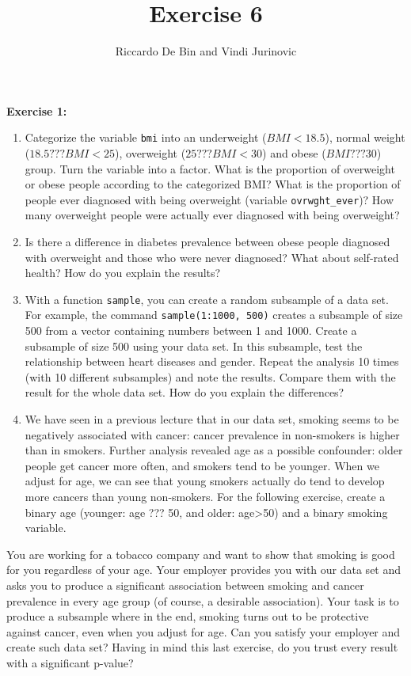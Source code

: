 \documentclass[]{article}
\title{Exercise 6}
\author{Riccardo De Bin and Vindi Jurinovic}
\date{}
\begin{document}
\maketitle


\textbf{Exercise 1:}

\begin{enumerate}
\def\labelenumi{\arabic{enumi}.}
\item
  Categorize the variable \texttt{bmi} into an underweight
  ($BMI < 18.5$), normal weight ($18.5 ??? BMI < 25$), overweight
  ($25 ??? BMI < 30$) and obese ($BMI ??? 30$) group. Turn the variable
  into a factor. What is the proportion of overweight or obese people
  according to the categorized BMI? What is the proportion of people
  ever diagnosed with being overweight (variable
  \texttt{ovrwght\_ever})? How many overweight people were actually ever
  diagnosed with being overweight?
\item
  Is there a difference in diabetes prevalence between obese people
  diagnosed with overweight and those who were never diagnosed? What
  about self-rated health? How do you explain the results?
\item
  With a function \texttt{sample}, you can create a random subsample of
  a data set. For example, the command \texttt{sample(1:1000, 500)}
  creates a subsample of size 500 from a vector containing numbers
  between 1 and 1000. Create a subsample of size 500 using your data
  set. In this subsample, test the relationship between heart diseases
  and gender. Repeat the analysis 10 times (with 10 different
  subsamples) and note the results. Compare them with the result for the
  whole data set. How do you explain the differences?
\item
  We have seen in a previous lecture that in our data set, smoking seems
  to be negatively associated with cancer: cancer prevalence in
  non-smokers is higher than in smokers. Further analysis revealed age
  as a possible confounder: older people get cancer more often, and
  smokers tend to be younger. When we adjust for age, we can see that
  young smokers actually do tend to develop more cancers than young
  non-smokers. For the following exercise, create a binary age (younger:
  age ??? 50, and older: age\textgreater{}50) and a binary smoking
  variable.
\end{enumerate}

You are working for a tobacco company and want to show that smoking is
good for you regardless of your age. Your employer provides you with our
data set and asks you to produce a significant association between
smoking and cancer prevalence in every age group (of course, a desirable
association). Your task is to produce a subsample where in the end,
smoking turns out to be protective against cancer, even when you adjust
for age. Can you satisfy your employer and create such data set? Having
in mind this last exercise, do you trust every result with a significant
p-value?
\end{document}
